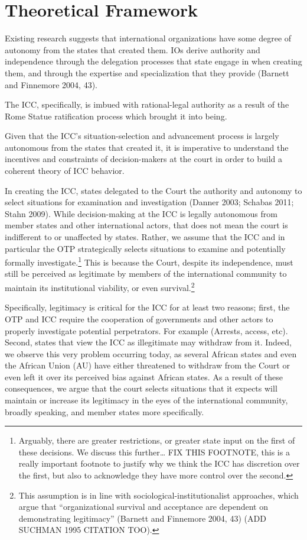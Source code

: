 \section*{Theoretical Framework}

Existing research suggests that international organizations have some degree of autonomy from the states that created them.  IOs derive authority and independence through the delegation processes that state engage in when creating them, and through the expertise and specialization that they provide (Barnett and Finnemore 2004, 43).  

The ICC, specifically, is imbued with rational-legal authority as a result of the Rome Statue ratification process which brought it into being.  

Given that the ICC's situation-selection and advancement process is largely autonomous from the states that created it, it is imperative to understand the incentives and constraints of decision-makers at the court in order to build a coherent theory of ICC behavior.

In creating the ICC, states delegated to the Court the authority and autonomy to select situations for examination and investigation (Danner 2003; Schabas 2011; Stahn 2009).  While decision-making at the ICC is legally autonomous from member states and other international actors, that does not mean the court is indifferent to or unaffected by states.  Rather, we assume that the ICC and in particular the OTP strategically selects situations to examine and potentially formally investigate.\footnote{Arguably, there are greater restrictions, or greater state input on the first of these decisions.  We discuss this further… FIX THIS FOOTNOTE, this is a really important footnote to justify why we think the ICC has discretion over the first, but also to acknowledge they have more control over the second.} This is because the Court, despite its independence, must still be perceived as legitimate by members of the international community to maintain its institutional viability, or even survival.\footnote{This assumption is in line with sociological-institutionalist approaches, which argue that ``organizational survival and acceptance are dependent on demonstrating legitimacy'' (Barnett and Finnemore 2004, 43) (ADD SUCHMAN 1995 CITATION TOO).}  

Specifically, legitimacy is critical for the ICC for at least two reasons; first, the OTP and ICC require the cooperation of governments and other actors to properly investigate potential perpetrators. For example (Arrests, access, etc). Second, states that view the ICC as illegitimate may withdraw from it. Indeed, we observe this very problem occurring today, as several African states and even the African Union (AU) have either threatened to withdraw from the Court or even left it over its perceived bias against African states.  As a result of these consequences, we argue that the court selects situations that it expects will maintain or increase its legitimacy in the eyes of the international community, broadly speaking, and member states more specifically. 

